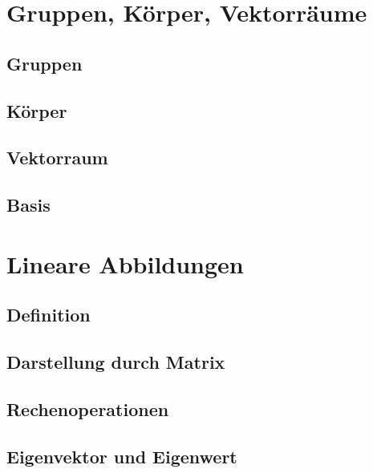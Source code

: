 \documentclass[a4paper,10pt]{scrartcl}
\begin{document}
    \section{Gruppen, Körper, Vektorräume}
        \subsection{Gruppen}
        \subsection{Körper}
        \subsection{Vektorraum}
        \subsection{Basis}

    \section{Lineare Abbildungen}
        \subsection{Definition}
        \subsection{Darstellung durch Matrix}
        \subsection{Rechenoperationen}
        \subsection{Eigenvektor und Eigenwert}
    
\end{document}
